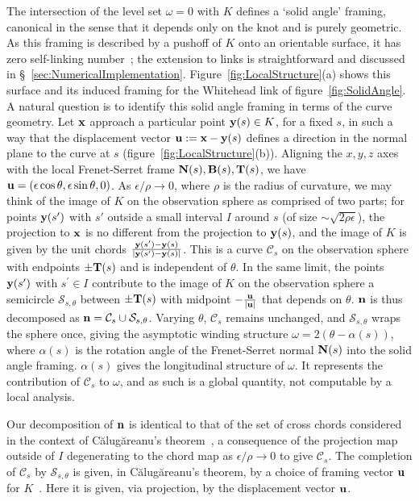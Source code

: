     The intersection of the level set $\omega=0$ with $K$ defines a `solid angle' framing, canonical in the sense that it depends only on the knot and is purely geometric. As this framing is described by a pushoff of $K$ onto an orientable surface, it has zero self-linking number~\citep{Lickorish1997}; the extension to links is straightforward and discussed in \S~\ref{sec:NumericalImplementation}. Figure~\ref{fig:LocalStructure}(a) shows this surface and its induced framing for the Whitehead link of figure~\ref{fig:SolidAngle}. A natural question is to identify this solid angle framing in terms of the curve geometry. Let ${\bf x}$ approach a particular point ${\bf y}(s) \in K$, for a fixed $s$, in such a way that the displacement vector ${\bf u} := {\bf x} - {\bf y}(s)$ defines a direction in the normal plane to the curve at $s$ (figure~\ref{fig:LocalStructure}(b)). Aligning the $x,y,z$ axes with the local Frenet-Serret frame ${\bf N}(s),{\bf B}(s),{\bf T}(s)$, we have ${\bf u} = (\epsilon \cos\theta, \epsilon \sin\theta,0)$. As $\epsilon/\rho \rightarrow 0$, where $\rho$ is the radius of curvature, we may think of the image of $K$ on the observation sphere as comprised of two parts; for points ${\bf y}(s')$ with $s'$ outside a small interval $I$ around $s$ (of size $\sim\sqrt{2\rho \epsilon}$), the projection to ${\bf x}$ is no different from the projection to ${\bf y}(s)$, and the image of $K$ is given by the unit chords $\frac{{\bf y}(s') - {\bf y}(s)}{|{\bf y}(s') - {\bf y}(s)|}$. This is a curve $\mathcal{C}_s$ on the observation sphere with endpoints $\pm {\bf T}(s)$ and is independent of $\theta$. In the same limit, the points ${\bf y}(s^{\prime})$ with $s^{\prime}\in I$ contribute to the image of $K$ on the observation sphere a semicircle $\mathcal{S}_{s,\theta}$ between $\pm{\bf T}(s)$ with midpoint $- \frac{{\bf u}}{|{\bf u}|}$ that depends on $\theta$. ${\bf n}$ is thus decomposed as ${\bf n} = \mathcal{C}_s \cup \mathcal{S}_{s,\theta}$. Varying $\theta$, $\mathcal{C}_s$ remains unchanged, and $\mathcal{S}_{s,\theta}$ wraps the sphere once, giving the asymptotic winding structure $\omega = 2(\theta - \alpha(s))$, where $\alpha(s)$ is the rotation angle of the Frenet-Serret normal ${\bf N}(s)$ into the solid angle framing. $\alpha(s)$ gives the longitudinal structure of $\omega$. It represents the contribution of $\mathcal{C}_s$ to $\omega$, and as such is a global quantity, not computable by a local analysis. 

    Our decomposition of ${\bf n}$ is identical to that of the set of cross chords considered in the context of C\u{a}lug\u{a}reanu's theorem~\citep{Dennis2005,Calugareanu1959}, a consequence of the projection map outside of $I$ degenerating to the chord map as $\epsilon/\rho \rightarrow 0$ to give $\mathcal{C}_s$. The completion of $\mathcal{C}_s$ by $\mathcal{S}_{s,\theta}$ is given, in C\u{a}lug\u{a}reanu's theorem, by a choice of framing vector ${\bf u}$ for $K$~\citep{Dennis2005}. Here it is given, via projection, by the displacement vector ${\bf u}$.


